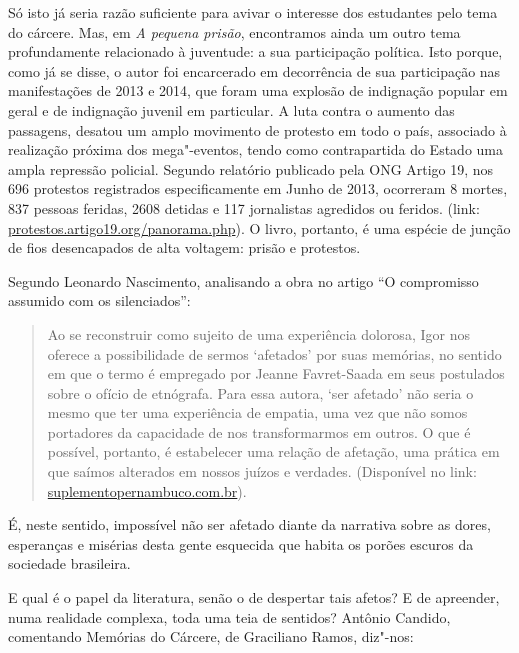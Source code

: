 \documentclass[11pt]{extarticle}
\begin{document}
Só isto já seria razão suficiente para avivar o interesse dos estudantes
pelo tema do cárcere. Mas, em \emph{A
pequena prisão}, encontramos ainda um
outro tema profundamente relacionado à juventude: a sua participação
política. Isto porque, como já se disse, o autor foi encarcerado em
decorrência de sua participação nas manifestações de 2013 e 2014, que
foram uma explosão de indignação popular em geral e de indignação
juvenil em particular. A luta contra o aumento das passagens, desatou um
amplo movimento de protesto em todo o país, associado à realização
próxima dos mega"-eventos, tendo como contrapartida do Estado uma ampla
repressão policial. Segundo relatório publicado pela ONG Artigo 19, nos
696 protestos registrados especificamente em Junho de 2013, ocorreram 8
mortes, 837 pessoas feridas, 2608 detidas e 117 jornalistas agredidos ou
feridos. (link: \url{protestos.artigo19.org/panorama.php}). O livro, portanto,
é uma espécie de junção de fios desencapados de alta voltagem: prisão e
protestos.

Segundo Leonardo Nascimento, analisando a obra no artigo ``O
compromisso assumido com os silenciados'':

\begin{quote}
Ao se reconstruir como
sujeito de uma experiência dolorosa, Igor nos oferece a possibilidade de
sermos `afetados' por suas memórias, no sentido em que o termo é
empregado por Jeanne Favret-Saada em seus postulados sobre o ofício de
etnógrafa. Para essa autora, `ser afetado' não seria o mesmo que ter uma
experiência de empatia, uma vez que não somos portadores da capacidade
de nos transformarmos em outros. O que é possível, portanto, é
estabelecer uma relação de afetação, uma prática em que saímos alterados
em nossos juízos e verdades. (Disponível no link: 
\href{https://suplementopernambuco.com.br/artigos/2032-o-compromisso-assumido-com-os-silenciados.html}{suplementopernambuco.com.br}).
\end{quote}

É, neste sentido, impossível não ser afetado diante da narrativa sobre
as dores, esperanças e misérias desta gente esquecida que habita os
porões escuros da sociedade brasileira.

E qual é o papel da literatura, senão o de despertar tais afetos? E de
apreender, numa realidade complexa, toda uma teia de sentidos? Antônio
Candido, comentando Memórias do Cárcere, de Graciliano Ramos, diz"-nos:
\end{document}
